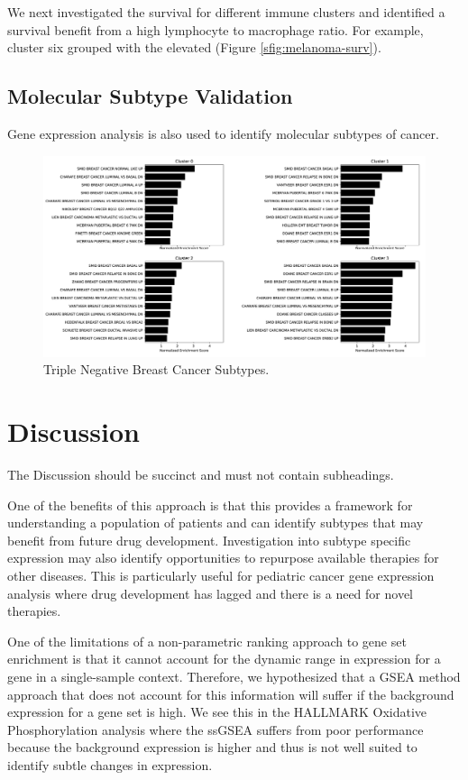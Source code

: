 \documentclass[fleqn,10pt]{wlscirep}
\begin{document}
We next investigated the survival for different immune clusters and identified a survival benefit from a high lymphocyte to macrophage ratio. For example, cluster six grouped with the elevated (Figure \ref{sfig:melanoma-surv}). 




\subsection*{Molecular Subtype Validation}
Gene expression analysis is also used to identify molecular subtypes of cancer.



\begin{figure}
	\centering
	\includegraphics[width=0.75\linewidth]{images/tcga-brca-tnbc-subtypes-gsea@2x}
	\caption{Triple Negative Breast Cancer Subtypes.}
	\label{sfig:tnbc-subtypes}
\end{figure}


\section*{Discussion}

The Discussion should be succinct and must not contain subheadings.

One of the benefits of this approach is that this provides a framework for understanding a population of patients and can identify subtypes that may benefit from future drug development. Investigation into subtype specific expression may also identify opportunities to repurpose available therapies for other diseases. This is particularly useful for pediatric cancer gene expression analysis where drug development has lagged and there is a need for novel therapies. 

One of the limitations of a non-parametric ranking approach to gene set enrichment is that it cannot account for the dynamic range in expression for a gene in a single-sample context. Therefore, we hypothesized that a GSEA method approach that does not account for this information will suffer if the background expression for a gene set is high. We see this in the HALLMARK Oxidative Phosphorylation analysis where the ssGSEA suffers from poor performance because the background expression is higher and thus is not well suited to identify subtle changes in expression.
\end{document}
